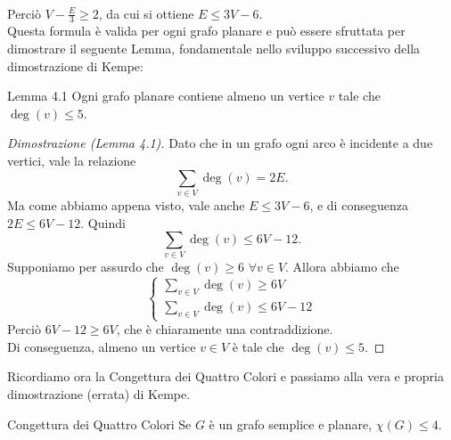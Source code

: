 \documentclass[a4paper,12pt,titlepage]{report}
\begin{document}
    \\Perciò $V - \frac{E}{3} \geq 2$, da cui si ottiene $E \leq 3V - 6$.
    \\Questa formula è valida per ogni grafo planare e può essere sfruttata per dimostrare il seguente Lemma, fondamentale nello sviluppo successivo della dimostrazione di Kempe:
    \begin{namedthm*}{Lemma 4.1}
    	Ogni grafo planare contiene almeno un vertice $v$ tale che $\deg(v) \leq 5$.
    \end{namedthm*}
    \begin{proof}[Dimostrazione (Lemma 4.1)]
    	Dato che in un grafo ogni arco è incidente a due vertici, vale la relazione 
    	\[
    	\sum_{v \in V} \deg(v) = 2E.
    	\]
    	Ma come abbiamo appena visto, vale anche $E \leq 3V - 6$, e di conseguenza $2E \leq 6V - 12$. Quindi 
    	\[
    	\sum_{v \in V} \deg(v) \leq 6V - 12.
    	\]
    	Supponiamo per assurdo che $\deg(v) \geq 6$ $\forall v \in V$.
    	Allora abbiamo che
    	\[
    	\begin{cases}
    		\sum_{v \in V} \deg(v) \geq 6V\\
    		\sum_{v \in V} \deg(v) \leq 6V - 12
    	\end{cases}
    	\] 	
    	Perciò $6V - 12 \geq 6V$, che è chiaramente una contraddizione.
    	\\Di conseguenza, almeno un vertice $v \in V$ è tale che $\deg(v) \leq 5$.
    \end{proof}
    Ricordiamo ora la Congettura dei Quattro Colori e passiamo alla vera e propria dimostrazione (errata) di Kempe.
    \begin{namedthm*}{Congettura dei Quattro Colori}
    	Se $G$ è un grafo semplice e planare, $\chi(G) \leq 4$.
    \end{namedthm*}
\end{document}
